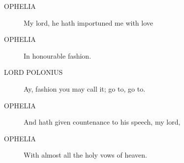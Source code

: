 \documentclass{article}
\begin{document}
\begin{description}
            
\item[OPHELIA] My lord, he hath importuned me with love
\item[OPHELIA] In honourable fashion.
\end{description}
          
\begin{description}
            
\item[LORD POLONIUS] Ay, fashion you may call it; go to, go to.
\end{description}
          
\begin{description}
            
\item[OPHELIA] And hath given countenance to his speech, my lord,
\item[OPHELIA] With almost all the holy vows of heaven.
\end{description}
          
\end{document}
